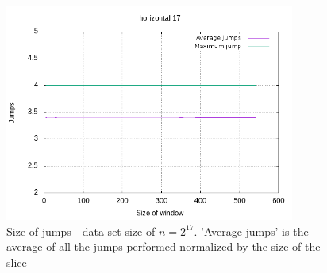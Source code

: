 

\begin{figure}[h]
    \centering
    \includegraphics[width = 0.85\textwidth]{pictures/analysis/jump_hori_17.png}
    \caption{Size of jumps - data set size of $n=2^{17}$. 'Average jumps' is the average of all the jumps performed normalized by the size of the slice}\label{fig:jump_hori_17}
\end{figure}
\clearpage


